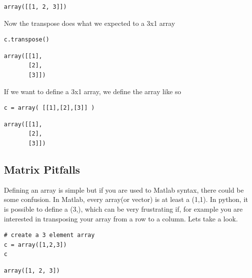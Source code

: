 \documentclass[%
oneside,                 %
final,                   %
10pt]{article}
\begin{document}
\begin{verbatim}
array([[1, 2, 3]])
\end{verbatim}


Now the transpose does what we expected to a 3x1 array
\begin{verbatim}
c.transpose()
\end{verbatim}

\begin{verbatim}
array([[1],
       [2],
       [3]])
\end{verbatim}

If we want to define a 3x1 array, we define the array like so
\begin{verbatim}
c = array( [[1],[2],[3]] )
\end{verbatim}

\begin{verbatim}
array([[1],
       [2],
       [3]])
\end{verbatim}

\subsection{Matrix Pitfalls}

Defining an array is simple but if you are used to Matlab syntax, there could be some confusion. In Matlab, every array(or vector) is at least a (1,1). In python, it is possible to define a (3,), which can be very frustrating if, for example you are interested in transposing your array from a row to a column. Lets take a look.

\begin{verbatim}
# create a 3 element array
c = array([1,2,3])
c
\end{verbatim}

\begin{verbatim}
array([1, 2, 3])
\end{verbatim}
\end{document}
